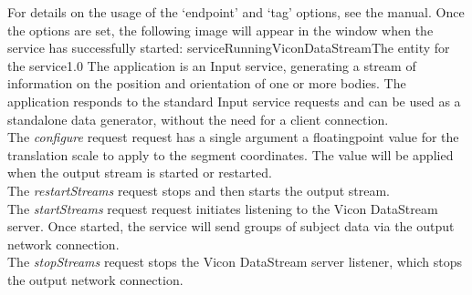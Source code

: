 For details on the usage of the `endpoint' and `tag' options, see the \emph{\CMU} manual.
Once the options are set, the following image will appear in the \emph{\CMU} window when
the service has successfully started:
%
{serviceRunningViconDataStream}{The \emph{\CMU} entity for the \emph{\VDSI} service}{1.0}
\secondaryEnd
\primaryEnd{}
The  application is an Input service,
generating a stream of information on the position and orientation of one or more bodies.
The application responds to the standard Input service requests and can be used as a
standalone data generator, without the need for a client connection.\\

The \emph{configure} request request has a single argument \longDash{} a
floating\longDash{}point value for the translation scale to apply to the segment
coordinates.
The value will be applied when the output stream is started or restarted.\\ 

The \emph{restartStreams} request stops and then starts the output stream.\\

The \emph{startStreams} request request initiates listening to the Vicon DataStream
server.
Once started, the service will send groups of subject data via the output \yarp{} network
connection.\\

The \emph{stopStreams} request stops the Vicon DataStream server listener, which stops the
output \yarp{} network connection.\\ 

